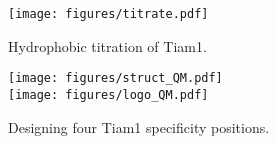 \documentclass[12pt]{article}
\begin{document}
\begin{figure}[!h]
\begin{center}
\vspace*{-1.5cm}
\texttt{[image: figures/titrate.pdf]}
\end{center}
\caption[width=1cm]{Hydrophobic titration of Tiam1.}
\end{figure}

\begin{figure}[!h]
\begin{center}
\vspace*{-1.5cm}
\texttt{[image: figures/struct\_QM.pdf]} \\
\texttt{[image: figures/logo\_QM.pdf]} \\
\end{center}
\caption[width=1cm]{Designing four Tiam1 specificity positions.}
\end{figure}
\end{document}
